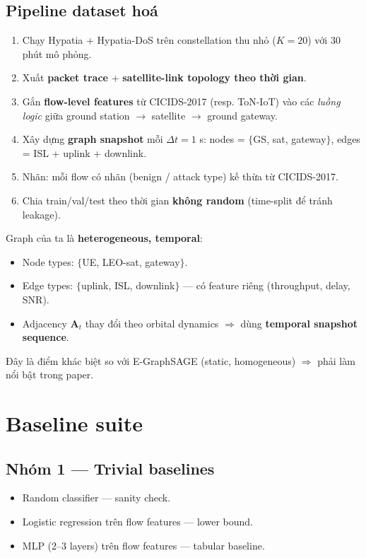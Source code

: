 \documentclass[11pt,a4paper]{article}
\begin{document}
\subsection{Pipeline dataset hoá}

\begin{enumerate}
  \item Chạy Hypatia + Hypatia-DoS trên constellation thu nhỏ ($K=20$) với 30 phút mô phỏng.
  \item Xuất \textbf{packet trace} + \textbf{satellite-link topology theo thời gian}.
  \item Gắn \textbf{flow-level features} từ CICIDS-2017 (resp. ToN-IoT) vào các \textit{luồng logic} giữa ground station $\rightarrow$ satellite $\rightarrow$ ground gateway.
  \item Xây dựng \textbf{graph snapshot} mỗi $\Delta t = 1$ s: nodes = $\{$GS, sat, gateway$\}$, edges = ISL + uplink + downlink.
  \item Nhãn: mỗi flow có nhãn (benign / attack type) kế thừa từ CICIDS-2017.
  \item Chia train/val/test theo thời gian \textbf{không random} (time-split để tránh leakage).
\end{enumerate}

\begin{goldbox}
Graph của ta là \textbf{heterogeneous, temporal}:
\begin{itemize}
  \item Node types: $\{$UE, LEO-sat, gateway$\}$.
  \item Edge types: $\{$uplink, ISL, downlink$\}$ --- có feature riêng (throughput, delay, SNR).
  \item Adjacency $\mathbf{A}_t$ thay đổi theo orbital dynamics $\Rightarrow$ dùng \textbf{temporal snapshot sequence}.
\end{itemize}
Đây là điểm khác biệt so với E-GraphSAGE (static, homogeneous) $\Rightarrow$ phải làm nổi bật trong paper.
\end{goldbox}

\section{Baseline suite}

\subsection{Nhóm 1 --- Trivial baselines}
\begin{itemize}
  \item Random classifier --- sanity check.
  \item Logistic regression trên flow features --- lower bound.
  \item MLP (2--3 layers) trên flow features --- tabular baseline.
\end{itemize}
\end{document}

